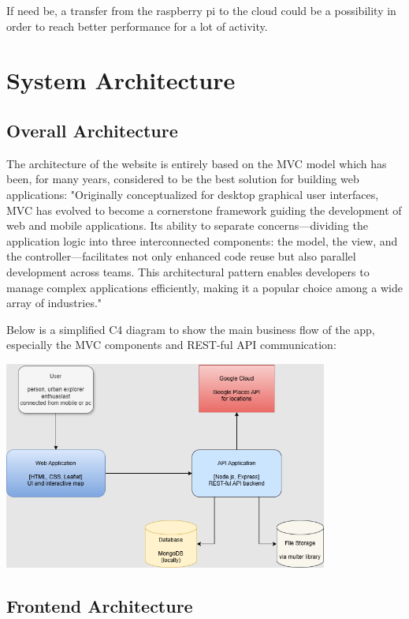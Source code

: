 \documentclass[12pt,a4paper]{report}
\begin{document}
If need be, a transfer from the raspberry pi to the cloud could be a possibility in order to reach better performance for a lot of activity.

\section{System Architecture}
\subsection{Overall Architecture}
The architecture of the website is entirely based on the MVC model which has been, for many years, considered to be the best solution for building web applications: "Originally conceptualized for desktop graphical user interfaces, MVC has evolved to become a cornerstone framework guiding the  development  of  web  and  mobile  applications.  Its  ability  to  separate  concerns—dividing  the application logic into three  interconnected  components:  the model, the view, and the  controller—facilitates  not  only  enhanced  code  reuse  but  also  parallel  development  across  teams.  This architectural  pattern  enables developers  to  manage complex  applications  efficiently, making  it  a popular choice among a wide array of industries."~\cite{mvcThesis}

Below is a simplified C4 diagram to show the main business flow of the app, especially the MVC components and REST-ful API communication:

\begin{center}
\includegraphics[width=0.8\textwidth]{images/licenta.drawio.png}
\end{center}

\subsection{Frontend Architecture}
\end{document}
